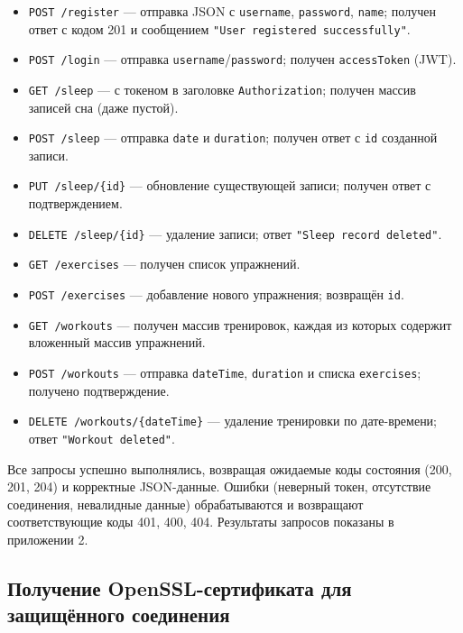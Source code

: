 \begin{itemize}
    \item \texttt{POST /register} — отправка JSON с \texttt{username}, \texttt{password}, \texttt{name}; получен ответ с кодом 201 и сообщением \texttt{"User registered successfully"}.
    \item \texttt{POST /login} — отправка \texttt{username}/\texttt{password}; получен \texttt{accessToken} (JWT).
    \item \texttt{GET /sleep} — с токеном в заголовке \texttt{Authorization}; получен массив записей сна (даже пустой).
    \item \texttt{POST /sleep} — отправка \texttt{date} и \texttt{duration}; получен ответ с \texttt{id} созданной записи.
    \item \texttt{PUT /sleep/\{id\}} — обновление существующей записи; получен ответ с подтверждением.
    \item \texttt{DELETE /sleep/\{id\}} — удаление записи; ответ \texttt{"Sleep record deleted"}.
    \item \texttt{GET /exercises} — получен список упражнений.
    \item \texttt{POST /exercises} — добавление нового упражнения; возвращён \texttt{id}.
    \item \texttt{GET /workouts} — получен массив тренировок, каждая из которых содержит вложенный массив упражнений.
    \item \texttt{POST /workouts} — отправка \texttt{dateTime}, \texttt{duration} и списка \texttt{exercises}; получено подтверждение.
    \item \texttt{DELETE /workouts/\{dateTime\}} — удаление тренировки по дате-времени; ответ \texttt{"Workout deleted"}.
\end{itemize}

Все запросы успешно выполнялись, возвращая ожидаемые коды состояния (200, 201, 204) и корректные JSON-данные. Ошибки (неверный токен, отсутствие соединения, невалидные данные) обрабатываются и возвращают соответствующие коды 401, 400, 404. Результаты запросов показаны в приложении 2.

\subsection{Получение OpenSSL-сертификата для защищённого соединения}

